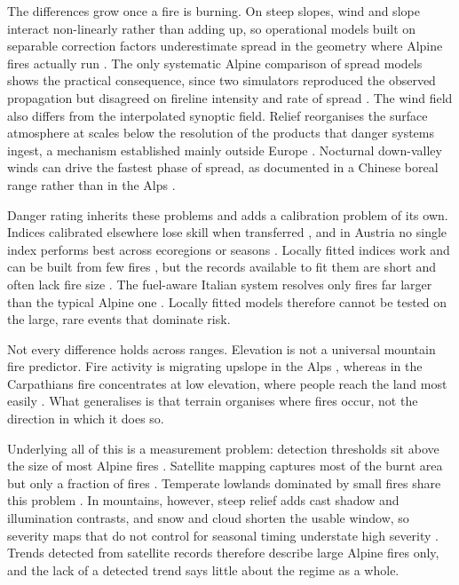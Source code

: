 \documentclass[11pt,a4paper]{article}
\begin{document}
The differences grow once a fire is burning. On steep slopes, wind and slope interact non-linearly rather than adding up, so operational models built on separable correction factors underestimate spread in the geometry where Alpine fires actually run \citep{hayajneh_wind_2026}. The only systematic Alpine comparison of spread models shows the practical consequence, since two simulators reproduced the observed propagation but disagreed on fireline intensity and rate of spread \citep{malanchini_modeling_2025}. The wind field also differs from the interpolated synoptic field. Relief reorganises the surface atmosphere at scales below the resolution of the products that danger systems ingest, a mechanism established mainly outside Europe \citep{sharples_overview_2009, ozaki_impact_2022}. Nocturnal down-valley winds can drive the fastest phase of spread, as documented in a Chinese boreal range rather than in the Alps \citep{wang_dynamic_2026}.

Danger rating inherits these problems and adds a calibration problem of its own. Indices calibrated elsewhere lose skill when transferred \citep{gelabert_assessing_2025, de_angelis_modelling_2015}, and in Austria no single index performs best across ecoregions or seasons \citep{arpaci_selecting_2013}. Locally fitted indices work and can be built from few fires \citep{de_angelis_modelling_2015}, but the records available to fit them are short and often lack fire size \citep{conedera_characterizing_2018, arpaci_selecting_2013}. The fuel-aware Italian system resolves only fires far larger than the typical Alpine one \citep{perello_fuelaware_2025}. Locally fitted models therefore cannot be tested on the large, rare events that dominate risk.

Not every difference holds across ranges. Elevation is not a universal mountain fire predictor. Fire activity is migrating upslope in the Alps \citep{beloiu_climatedriven_2026}, whereas in the Carpathians fire concentrates at low elevation, where people reach the land most easily \citep{manczinger_fire_2025}. What generalises is that terrain organises where fires occur, not the direction in which it does so.

Underlying all of this is a measurement problem: detection thresholds sit above the size of most Alpine fires \citep{muller_forest_2020, beloiu_climatedriven_2026}. Satellite mapping captures most of the burnt area but only a fraction of fires \citep{jrc_advance_2026}. Temperate lowlands dominated by small fires share this problem \citep{stoof_temperate_2024}. In mountains, however, steep relief adds cast shadow and illumination contrasts, and snow and cloud shorten the usable window, so severity maps that do not control for seasonal timing understate high severity \citep{morresi_mapping_2022}. Trends detected from satellite records therefore describe large Alpine fires only, and the lack of a detected trend says little about the regime as a whole.
\end{document}
